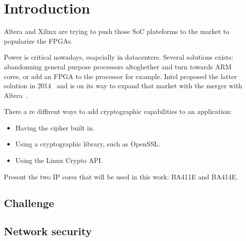 \chapter{Introduction}

Altera and Xilinx are trying to push those SoC plateforms to the market to popularize the FPGAs.

Power is critical nowadays, esapcially in datacenters.
Several solutions exists: abandonning general purpose processors altoghether and turn towards ARM cores, or add an FPGA to the processor for example.
Intel proposed the latter solution in 2014~\cite{intel-xeon-fpga} and is on its way to expand that market with the merger with Altera~\cite{intel-altera-merger}.

There a re diffirent ways to add cryptographic capabilities to an application:
\begin{itemize}
	\item Having the cipher built in.
	\item Using a cryptographic library, such as OpenSSL.
	\item Using the Linux Crypto API.
\end{itemize}

Present the two IP cores that will be used in this work: BA411E and BA414E.


\section{Challenge}

\section{Network security}